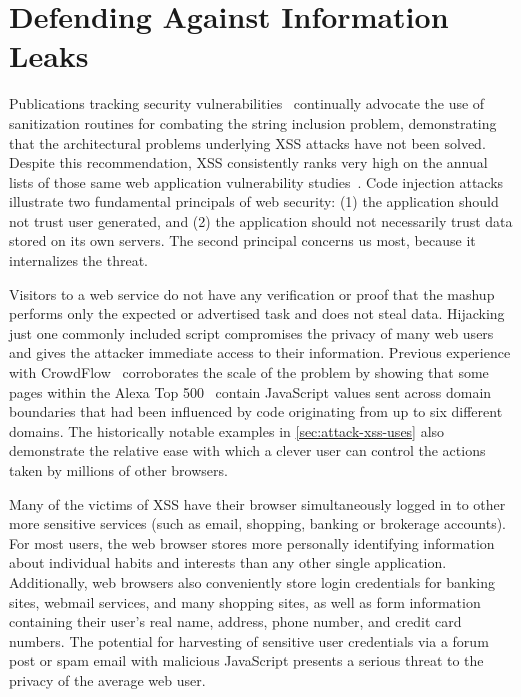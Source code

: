 \chapter{Defending Against Information Leaks}\label{ch:defense}

\begin{comment}
on using information flow techniques which can detect and prevent malicious behavior of executing programs.

- change language semantics
- augment memory model with labels
- detect and intercept xss
- prevent information leakage

Combine earlier approaches into a universal and comprehensive framework
- decentralized labeling
- support more flexible policies
- hybrid static/dynamic analysis
- dynamically track information flow
- pervasively works at the lowest layer
\end{comment}

Publications tracking security vulnerabilities~\cite{owasp, cwe, whitehat} continually advocate the use of sanitization routines for combating the string inclusion problem, demonstrating that the architectural problems underlying XSS attacks have not been solved.
Despite this recommendation, XSS consistently ranks very high on the annual lists of those same web application vulnerability studies~\cite{owasp, cwe, whitehat}.
Code injection attacks illustrate two fundamental principals of web security: (1) the application should not trust user generated, and (2) the application should not necessarily trust data stored on its own servers.
The second principal concerns us most, because it internalizes the threat.

Visitors to a web service do not have any verification or proof that the mashup performs only the expected or advertised task and does not steal data.
Hijacking just one commonly included script compromises the privacy of many web users~\cite{nikiforakis.etal+12} and gives the attacker immediate access to their information.
Previous experience with CrowdFlow~\cite{kerschbaumer.etal+13} corroborates the scale of the problem by showing that some pages within the Alexa Top 500~\cite{alexa} contain JavaScript values sent across domain boundaries that had been influenced by code originating from up to six different domains.
The historically notable examples in \autoref{sec:attack-xss-uses} also demonstrate the relative ease with which a clever user can control the actions taken by millions of other browsers.

Many of the victims of XSS have their browser simultaneously logged in to other more sensitive services (such as email, shopping, banking or brokerage accounts).
For most users, the web browser stores more personally identifying information about individual habits and interests than any other single application.
Additionally, web browsers also conveniently store login credentials for banking sites, webmail services, and many shopping sites, as well as form information containing their user's real name, address, phone number, and credit card numbers.
The potential for harvesting of sensitive user credentials via a forum post or spam email with malicious JavaScript presents a serious threat to the privacy of the average web user.

